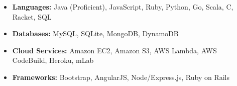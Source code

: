 \documentclass{article}
\begin{document}
    \begin{itemize}
        \item {
        \textbf{Languages:}
        \vspace{-0.2cm}
        Java (Proficient), JavaScript, Ruby, Python, Go, Scala, C, Racket, SQL
        }
        \item {
        \textbf{Databases:}
        \vspace{-0.2cm}
        MySQL, SQLite, MongoDB, DynamoDB
        }
        \item {
        \textbf{Cloud Services:}
        \vspace{-0.2cm}
        Amazon EC2, Amazon S3, AWS Lambda, AWS CodeBuild, Heroku, mLab
        }
        \item {
        \textbf{Frameworks:}
        Bootstrap, AngularJS, Node/Express.js, Ruby on Rails
        }
    \end{itemize}
\end{document}
